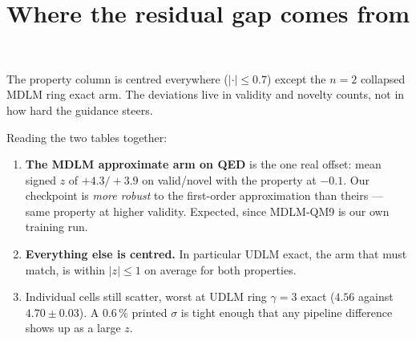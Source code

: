 \documentclass[11pt]{article}
\begin{document}
\section{Where the residual gap comes from}
\begin{table}[htbp]
\centering
\small
{}
\\[0.4em] \begin{minipage}{0.92\textwidth}\footnotesize The property column is centred everywhere ($|{\cdot}|\le 0.7$) except the $n{=}2$ collapsed MDLM ring exact arm. The deviations live in validity and novelty counts, not in how hard the guidance steers.\end{minipage}
\caption{Mean \emph{signed} $z$ per arm. Random scatter would average to zero; a consistent sign is a systematic offset.}
\label{tab:repro-direction}
\end{table}


Reading the two tables together:

\begin{enumerate}
  \item \textbf{The MDLM approximate arm on QED} is the one real offset: mean
        signed $z$ of $+4.3 / +3.9$ on
        valid/novel with the property at $-0.1$.
        Our checkpoint is \emph{more robust} to the first-order approximation
        than theirs --- same property at higher validity. Expected, since
        MDLM-QM9 is our own training run.
  \item \textbf{Everything else is centred.} In particular UDLM exact, the arm
        that must match, is within $|z|\le 1$ on average for both properties.
  \item Individual cells still scatter, worst at UDLM ring $\gamma{=}3$ exact
        ($4.56$ against $4.70\pm0.03$). A $0.6\,\%$ printed $\sigma$ is tight
        enough that any pipeline difference shows up as a large $z$.
\end{enumerate}
\end{document}
